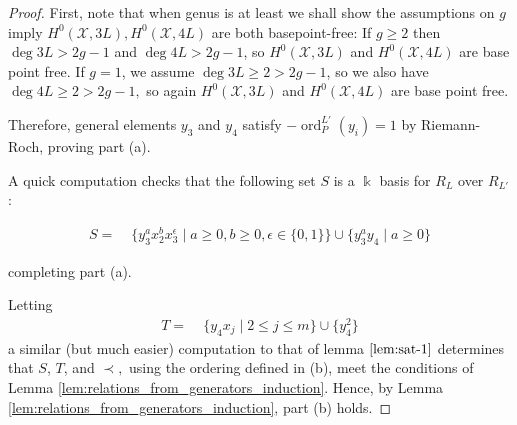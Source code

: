 \documentclass{amsart}
\theoremstyle{plain}
\theoremstyle{definition}
\theoremstyle{remark}
\numberwithin{equation}{section}
\newcommand\Bk{{\Bbbk}}
\DeclareMathOperator{\ord}{ord}
\newcommand\sx{\mathscr X}
\newcommand{\halfcan}{L}
\DeclareMathOperator{\initial}{in_\prec}
\begin{document}
\begin{proof}
First, note that when genus is at least we shall show the assumptions on $g$ imply $H^0(\sx, 3 \halfcan), H^0(\sx, 4 \halfcan)$ are both basepoint-free: If $g \geq 2$ then $\deg 3 \halfcan > 2g - 1$ 
and $\deg 4 \halfcan > 2g - 1$, so $H^0(\sx, 3 \halfcan)$ and $H^0(\sx, 4 \halfcan)$ are base point free. If $g = 1$, we assume $\deg 3 \halfcan \geq 2 > 2g - 1$, so we also have $\deg 4 \halfcan \geq 2 > 2g - 1,$ so again $H^0(\sx, 3 \halfcan)$ and $H^0(\sx, 4 \halfcan)$ are base point free. 

Therefore, general elements $y_3$ and $y_4$ satisfy $-\ord_P^{\halfcan'}(y_i) = 1$ by Riemann-Roch, proving part (a).

A quick computation checks that
the following set $S$ is a $\Bk$ basis for $R_\halfcan$ over $R_{\halfcan'}$:

\begin{align*}
	S =	& \; \{ y_3^ax_2^b x_3^\epsilon \mid a \geq 0, b 
	\geq 0, \epsilon \in \{0, 1\}\} \cup \{ y_3^ay_4 \mid a \geq 0 \}
\end{align*}

\noindent
completing part (a).

Letting
\begin{align*}
	T =   &\; \{ y_4 x_j \mid 2 \leq j \leq m \}\cup \{ y_4^2 \}
\end{align*}
a similar (but much easier) computation to that of lemma $\ref{lem:sat-1}$ determines that $S$, $T$, and $\prec,$ using the ordering defined in (b), meet the conditions of 
Lemma \ref{lem:relations_from_generators_induction}. 
Hence, by Lemma \ref{lem:relations_from_generators_induction}, part (b) holds.



\end{proof}
\end{document}
